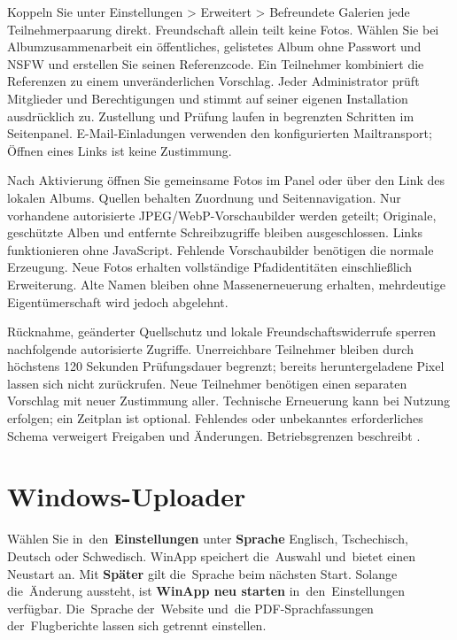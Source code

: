 \documentclass[11pt,a4paper]{article}
\newcommand{\filepath}[1]{\path{#1}}
\newcommand{\ui}[1]{\textbf{#1}}
\begin{document}
Koppeln Sie unter Einstellungen > Erweitert > Befreundete Galerien jede
Teilnehmerpaarung direkt. Freundschaft allein teilt keine Fotos. Wählen Sie bei
Albumzusammenarbeit ein öffentliches, gelistetes Album ohne Passwort und NSFW
und erstellen Sie seinen Referenzcode. Ein Teilnehmer kombiniert die Referenzen
zu einem unveränderlichen Vorschlag. Jeder Administrator prüft Mitglieder und
Berechtigungen und stimmt auf seiner eigenen Installation ausdrücklich zu.
Zustellung und Prüfung laufen in begrenzten Schritten im Seitenpanel.
E-Mail-Einladungen verwenden den konfigurierten Mailtransport; Öffnen eines
Links ist keine Zustimmung.

Nach Aktivierung öffnen Sie gemeinsame Fotos im Panel oder über den Link des
lokalen Albums. Quellen behalten Zuordnung und Seitennavigation. Nur vorhandene
autorisierte JPEG/WebP-Vorschaubilder werden geteilt; Originale, geschützte
Alben und entfernte Schreibzugriffe bleiben ausgeschlossen. Links funktionieren
ohne JavaScript. Fehlende Vorschaubilder benötigen die normale Erzeugung. Neue
Fotos erhalten vollständige Pfadidentitäten einschließlich Erweiterung. Alte
Namen bleiben ohne Massenerneuerung erhalten, mehrdeutige Eigentümerschaft wird
jedoch abgelehnt.

Rücknahme, geänderter Quellschutz und lokale Freundschaftswiderrufe sperren
nachfolgende autorisierte Zugriffe. Unerreichbare Teilnehmer bleiben durch
höchstens 120 Sekunden Prüfungsdauer begrenzt; bereits heruntergeladene Pixel
lassen sich nicht zurückrufen. Neue Teilnehmer benötigen einen separaten
Vorschlag mit neuer Zustimmung aller. Technische Erneuerung kann bei Nutzung
erfolgen; ein Zeitplan ist optional. Fehlendes oder unbekanntes erforderliches
Schema verweigert Freigaben und Änderungen. Betriebsgrenzen beschreibt
\filepath{docs/COOPERATIVE_GALLERIES.md}.

\section{Windows-Uploader}
Wählen Sie in~den~\ui{Einstellungen} unter \ui{Sprache} Englisch,
Tschechisch, Deutsch oder Schwedisch. WinApp speichert die~Auswahl und~bietet
einen Neustart an. Mit \ui{Später} gilt die~Sprache beim nächsten Start.
Solange die~Änderung aussteht, ist \ui{WinApp neu starten} in~den~Einstellungen
verfügbar. Die~Sprache der~Website und~die
PDF-Sprachfassungen der~Flugberichte lassen sich getrennt einstellen.
\end{document}
